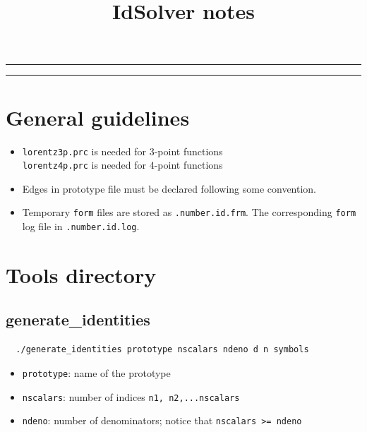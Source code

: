 \documentclass[a4paper,11pt]{article}
\title{IdSolver notes}
\begin{document}
\maketitle

\noindent \rule{\textwidth}{1pt}
\tableofcontents
\noindent \rule{\textwidth}{1pt}

\newpage

\section{General guidelines}


\begin{itemize}
  \item
  \verb+lorentz3p.prc+ is needed for 3-point functions\\
  \verb+lorentz4p.prc+ is needed for 4-point functions
  \item
  Edges in prototype file must be declared following some convention.
  \item
  Temporary \verb+form+ files are stored as \verb+.number.id.frm+. The
  corresponding \verb+form+ log file in \verb+.number.id.log+.
\end{itemize}

\section{Tools directory}

\subsection{generate\_identities}

\begin{verbatim}
  ./generate_identities prototype nscalars ndeno d n symbols
\end{verbatim}

\begin{itemize}
  \item
  \verb+prototype+: name of the prototype
  \item
  \verb+nscalars+: number of indices \verb+n1, n2,...nscalars+
  \item
  \verb+ndeno+: number of denominators; notice that \verb+nscalars >= ndeno+
\end{itemize}
\end{document}
